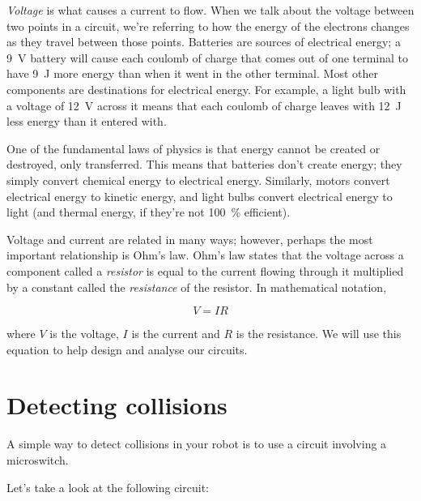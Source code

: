 \documentclass{article}
\begin{document}
\emph{Voltage} is what causes a current to flow. When we talk about the voltage
between two points in a circuit, we're referring to how the energy of the
electrons changes as they travel between those points. Batteries are sources
of electrical energy; a \SI{9}{\volt} battery will cause each coulomb of charge
that comes out of one terminal to have \SI{9}{\joule} more energy than when it
went in the other terminal. Most other components are destinations for
electrical energy. For example, a light bulb with a voltage of \SI{12}{\volt}
across it means that each coulomb of charge leaves with \SI{12}{\joule} less
energy than it entered with.

One of the fundamental laws of physics is that energy cannot be created or
destroyed, only transferred. This means that batteries don't create energy;
they simply convert chemical energy to electrical energy. Similarly, motors
convert electrical energy to kinetic energy, and light bulbs convert electrical
energy to light (and thermal energy, if they're not \SI{100}{\percent}
efficient).

Voltage and current are related in many ways; however, perhaps the most
important relationship is Ohm's law. Ohm's law states that the voltage across
a component called a \emph{resistor} is equal to the current flowing through it
multiplied by a constant called the \emph{resistance} of the resistor. In
mathematical notation,

\begin{equation*}
V = I R
\end{equation*}

where $V$ is the voltage, $I$ is the current and $R$ is the resistance. We will
use this equation to help design and analyse our circuits.

\newpage

\section{Detecting collisions}

A simple way to detect collisions in your robot is to use a circuit involving a
microswitch. 

Let's take a look at the following circuit:
\end{document}
